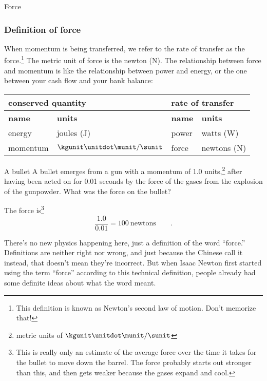 \begin{envsubsection}{Force}
\subsubsection{Definition of force}
When momentum is being transferred, we refer to the rate of transfer as the force.\footnote{This
definition is known as Newton's second law of motion. Don't memorize that!} The metric
unit of force is the newton (N).
The relationship between force and momentum is like the relationship between
power and energy, or the one between your cash flow and your bank balance:

\begin{tabular}{|p{20mm}p{20mm}|p{20mm}p{20mm}|}
\hline
\multicolumn{2}{|p{40mm}|}{\textbf{conserved quantity}} &\multicolumn{2}{|p{40mm}|}{\textbf{rate of transfer}} \\
\hline
\textbf{name} & \textbf{units} & \textbf{name} & \textbf{units} \\
energy & joules (J) & power & watts (W) \\
momentum & $\kgunit\unitdot\munit/\sunit$ & force & newtons (N)\\
\hline
\end{tabular}

\begin{eg}{A bullet}\label{eg:bulletforce}
\egquestion A bullet emerges from a gun with a momentum of 1.0 units,\footnote{metric units of $\kgunit\unitdot\munit/\sunit$} after
having been acted on for 0.01 seconds by the force of the gases from the explosion of the gunpowder.
What was the force on the bullet?

\eganswer 
The force is\footnote{This is really only an estimate of the average force over the time it takes for the bullet
to move down the barrel. The force probably starts out stronger than this, and then gets weaker because the gases
expand and cool.}
\begin{equation*}
	\frac{1.0}{0.01} = 100\ \text{newtons} \qquad .
\end{equation*}
\end{eg}

There's no new physics happening here, just a definition of the word ``force.'' Definitions are neither right nor
wrong, and just because the Chinese call it  instead, that doesn't mean they're
incorrect. But when Isaac Newton first started using the term ``force'' according to this
technical definition, people already had some definite ideas about what the word meant.


\end{envsubsection}
